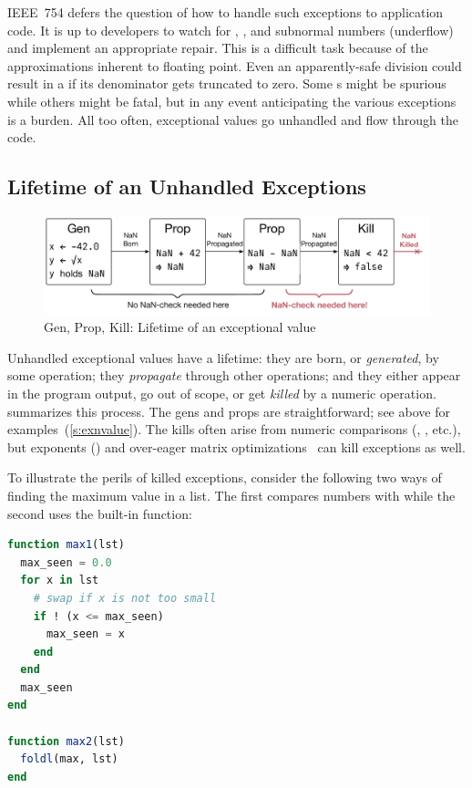 \documentclass{juliacon}
\begin{document}
IEEE~754 defers the question of how to handle such exceptions to application code.
It is up to developers to watch for \Nan{}, \Inf{}, and subnormal numbers (underflow)
and implement an appropriate repair.
This is a difficult task because of the approximations inherent to
floating point.
Even an apparently-safe division could result in a \Nan{} if its
denominator gets truncated to zero.
Some \Nan{}s might be spurious while others might be fatal, but in any event
anticipating the various exceptions is a burden.
All too often, exceptional values go unhandled and flow through the code.


\subsection{Lifetime of an Unhandled Exceptions}
\label{s:to-kill-a-fp}

\begin{figure}[t]
  \includegraphics[width=\columnwidth]{fig/genpropkill-outline_vector.pdf}
  \caption{Gen, Prop, Kill: Lifetime of an exceptional value}
  \label{f:gpk}
\end{figure}

Unhandled exceptional values have a lifetime: they are born, or \emph{generated}, by some operation; they \emph{propagate} through other operations; and they either appear in the program output, go out of scope, or get \emph{killed} by a numeric operation.
 summarizes this \genpropkill{} process.
The gens and props are straightforward; see above for examples~(\cref{s:exnvalue}).
The kills often arise from numeric comparisons (\code{<}, \code{=}, etc.),
but exponents () and over-eager matrix
optimizations~\cite{ddghlllprr-correctness-2022} can kill exceptions as well.

To illustrate the perils of killed exceptions, consider the following two ways
of finding the maximum value in a list.
The first compares numbers with \code{<=}
while the second uses the built-in  function:

\begin{lstlisting}[language = Julia]
function max1(lst)
  max_seen = 0.0
  for x in lst
    # swap if x is not too small
    if ! (x <= max_seen)
      max_seen = x
    end
  end
  max_seen
end

function max2(lst)
  foldl(max, lst)
end
\end{lstlisting}
\end{document}
